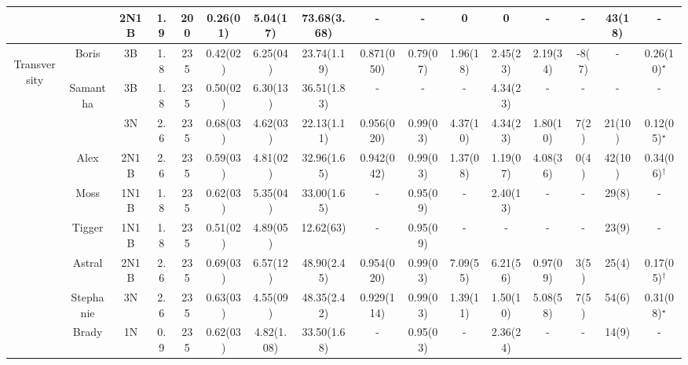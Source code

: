 \begin{table}
\begin{center}
\begin{tabular}{|c|c|ccc|ccc|ccccc|cc|c|}
			&  & 2N1B & 1.9 & 200 & 0.26(01) & 5.04(17) & 73.68(3.68) & - & - & 0 & 0 & - & - & 43(18) & - \\
			\hline
			\hline
			\multirow{12}{*}{\begin{sideways}Transversity\end{sideways}} & Boris & 3B & 1.8 & 235 & 0.42(02) & 6.25(04) & 23.74(1.19) & 0.871(050) & 0.79(07) & 1.96(18) & 2.45(23) & 2.19(34) & -8(7) & - & 0.26(10)$^\star$ \\
			\cline{2-16}
			& \multirow{2}{*}{Samantha} & 3B & 1.8 & 235 & 0.50(02) & 6.30(13) & 36.51(1.83) & - & - & - & 4.34(23) & - & - & - & -\\
			& & 3N & 2.6 & 235 & 0.68(03) & 4.62(03) & 22.13(1.11) & 0.956(020) & 0.99(03) & 4.37(10) & 4.34(23) & 1.80(10) & 7(2) & 21(10) & 0.12(05)$^\star$\\
			\cline{2-16}
			& Alex & 2N1B & 2.6 & 235 & 0.59(03) & 4.81(02) & 32.96(1.65) & 0.942(042) & 0.99(03) & 1.37(08) & 1.19(07) & 4.08(36) & 0(4) & 42(10) & 0.34(06)$^\dagger$ \\
			\cline{2-16}
			& Moss & 1N1B & 1.8 & 235 & 0.62(03) & 5.35(04) & 33.00(1.65) & - & 0.95(09) & - & 2.40(13) & - & - & 29(8) & -\\
			\cline{2-16}
			& Tigger & 1N1B & 1.8 & 235 & 0.51(02) & 4.89(05) & 12.62(63) & - & 0.95(09) & - & - & - & - & 23(9) & -\\
			\cline{2-16}
			& Astral & 2N1B & 2.6 & 235 & 0.69(03) & 6.57(12) & 48.90(2.45) & 0.954(020) & 0.99(03) & 7.09(55) & 6.21(56) & 0.97(09) & 3(5) & 25(4) & 0.17(05)$^\dagger$\\
			\cline{2-16}
			& Stephanie & 3N & 2.6 & 235 & 0.63(03) & 4.55(09) & 48.35(2.42) & 0.929(114) & 0.99(03) & 1.39(11) & 1.50(10) & 5.08(58) & 7(5) & 54(6) & 0.31(08)$^\star$\\
			\cline{2-16}
			& \multirow{3}{*}{Brady} & 1N & 0.9 & 235 & 0.62(03) & 4.82(1.08) & 33.50(1.68) & - & 0.95(03) & - & 2.36(24) & -  & - & 14(9) & -\\

\end{tabular}
\end{center}
\end{table}
